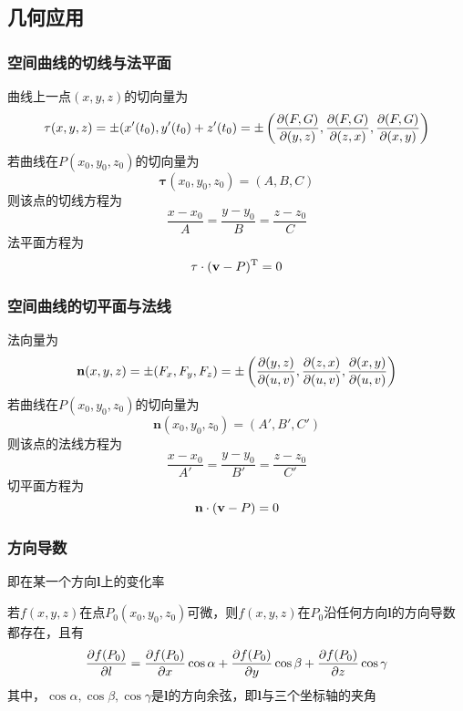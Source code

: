 \subsection{几何应用}
\subsubsection{空间曲线的切线与法平面}
曲线上一点$(x,y,z)$的切向量为
\[\mathbf{\tau}(x,y,z)=\pm(x'(t_0),y'(t_0)+z'(t_0)=\pm\left(\dfrac{\partial (F,G)}{\partial (y,z)},\dfrac{\partial (F,G)}{\partial (z,x)},\dfrac{\partial (F,G)}{\partial (x,y)}\right)\]
若曲线在$P(x_0,y_0,z_0)$的切向量为
\[\mathbf{\tau}(x_0,y_0,z_0)=(A,B,C)\]
则该点的切线方程为
\[\frac{x-x_0}{A}=\frac{y-y_0}{B}=\frac{z-z_0}{C}\]
法平面方程为
\[\mathbf{\tau}\cdot(\mathbf{v}-P)^{\mathrm{T}}=0\]

\subsubsection{空间曲线的切平面与法线}
法向量为
\[\mathbf{n}(x,y,z)=\pm(F_x,F_y,F_z)=\pm\left(\dfrac{\partial (y,z)}{\partial (u,v)},\dfrac{\partial (z,x)}{\partial (u,v)},\dfrac{\partial (x,y)}{\partial (u,v)}\right)\]
若曲线在$P(x_0,y_0,z_0)$的切向量为
\[\mathbf{n}(x_0,y_0,z_0)=(A',B',C')\]
则该点的法线方程为
\[\frac{x-x_0}{A'}=\frac{y-y_0}{B'}=\frac{z-z_0}{C'}\]
切平面方程为
\[\mathbf{n}\cdot(\mathbf{v}-P)=0\]

\subsubsection{方向导数}
即在某一个方向$\mathbf{l}$上的变化率
\begin{theorem}
若$f(x,y,z)$在点$P_0(x_0,y_0,z_0)$可微，则$f(x,y,z)$在$P_0$沿任何方向$\mathbf{l}$的方向导数都存在，且有
\[\dfrac{\partial f(P_0)}{\partial l}=\dfrac{\partial f(P_0)}{\partial x}\cos\alpha+\dfrac{\partial f(P_0)}{\partial y}\cos\beta+\dfrac{\partial f(P_0)}{\partial z}\cos\gamma\]
其中，$\cos\alpha,\cos\beta,\cos\gamma$是$\mathbf{l}$的方向余弦，即$\mathbf{l}$与三个坐标轴的夹角
\end{theorem}


